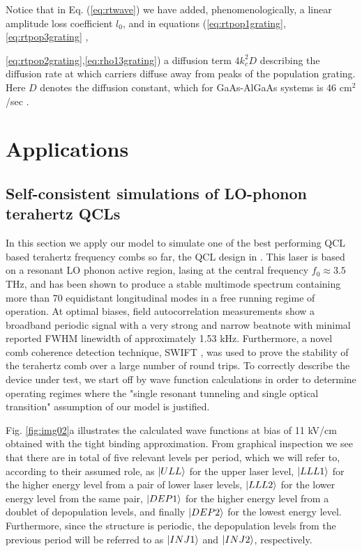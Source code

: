 \documentclass[10pt,letterpaper]{article}
\begin{document}
Notice that in Eq. (\ref{eq:rtwave}) we have added, phenomenologically, a linear amplitude loss coefficient $l_0$, and in equations (\ref{eq:rtpop1grating},\ref{eq:rtpop3grating} ,{\ref{eq:rtpop2grating},\ref{eq:rho13grating}) a diffusion term $4k_c^2D$ describing the diffusion rate at which carriers diffuse away from peaks of the population grating. Here $D$ denotes the diffusion constant, which for GaAs-AlGaAs systems is 46 cm$^2$/sec \cite{wang2009mode,vukovic2016multimode}.

\section{Applications}
\label{sec:application}
\subsection{Self-consistent simulations of LO-phonon terahertz QCLs}
\label{subsec:extension}
In this section we apply our model to simulate one of the best performing QCL based terahertz frequency combs so far, the QCL design in \cite{burghoff2014terahertz}. This laser is based on a resonant LO phonon active region, lasing at the central frequency  $f_0\approx 3.5$ THz, and  has been shown to produce a stable multimode spectrum containing more than 70 equidistant longitudinal modes in a free running regime of operation. At optimal biases, field autocorrelation measurements show a broadband periodic signal with a very strong and narrow beatnote with minimal reported FWHM linewidth of approximately 1.53 kHz. Furthermore, a novel comb coherence detection technique, SWIFT \cite{burghoff2015evaluating}, was used to prove the stability of the terahertz comb over a large number of round trips. 
To correctly describe the device under test, we start off by wave function calculations in order to determine operating regimes where the "single resonant tunneling and single optical transition" assumption of our model is justified. 

Fig. \ref{fig:img02}a illustrates the calculated wave functions at bias of 11 kV/cm obtained with the tight binding approximation. From graphical inspection we see that there are in total of five relevant levels per period, which we will refer to, according to their assumed role, as $\Ket{ULL}$ for the upper laser level, $\Ket{LLL1}$ for the higher energy level from a pair of lower laser levels, $\Ket{LLL2}$ for the lower energy level from the same pair, $\Ket{DEP1}$ for the higher energy level from a doublet of depopulation levels, and finally $\Ket{DEP2}$ for the lowest energy level. Furthermore, since the structure is periodic, the depopulation levels from the previous period will be referred to as $\Ket{INJ1}$ and $\Ket{INJ2}$, respectively.

}
\end{document}
